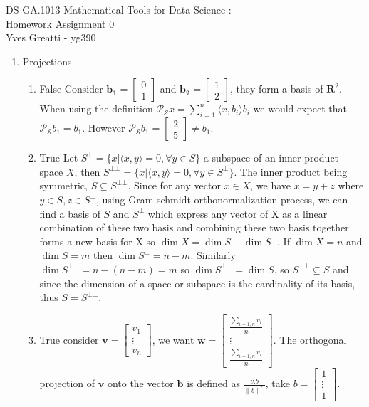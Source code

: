 \documentclass[10pt]{article}
\newcommand{\be}{\begin{enumerate}}
\newcommand{\ee}{\end{enumerate}}
\newcommand{\mat}[1]{{\mathbf #1}}
\newcommand{\0}{\mat{0}}
\newcommand{\vect}[1]{\bm{#1}} %
\newcommand{\Proj}{\mathcal{P}_{\mathcal{S}}}
\begin{document}
\noindent DS-GA.1013 Mathematical Tools for Data Science :\\
Homework Assignment 0 \\
Yves Greatti - yg390\\

\begin{enumerate}
\item Projections

\be
	\item False
	Consider 
	$\vect{b_1} = \begin{bmatrix} 0\\ 1\end{bmatrix}$ and $\vect{b_2} = \begin{bmatrix} 1\\ 2\end{bmatrix}$, they form a basis of $\mat{R}^2$.
	When using the definition $\Proj x = \sum_{i=1}^n \langle x, b_i \rangle b_i$ we would expect that $\Proj b_1 = b_1$. However $\Proj b_1 = \begin{bmatrix} 2\\ 5\end{bmatrix} \neq b_1$.
	\item True
	Let $S^\bot = \{x |  \langle x,y  \rangle  = 0, \forall y \in S \}$ a subspace of an inner product space $X$, then $S^{\bot\bot} = \{x |  \langle x,y  \rangle  = 0, \forall y \in S^\bot \}$. The inner product being symmetric, $S \subseteq S^{\bot\bot}$.
	Since for any vector $x \in X$, we have $x = y + z$ where $y \in S, z \in S^\bot$, using Gram-schmidt orthonormalization process, we can find a basis of $S$ and $S^\bot$ which express any vector of X as a linear combination
	of these two basis and combining these two basis together forms a new basis for X so $\dim X = \dim S + \dim S^\bot$. If $\dim X = n$ and $\dim S = m$ then $\dim S^\bot = n - m$.
	Similarly $\dim S^{\bot\bot} = n  - (n- m) = m$ so $\dim S^{\bot\bot} = \dim S$, so $S^{\bot\bot} \subseteq S$  and since the dimension of a space or subspace is the cardinality of its basis, thus $S = S^{\bot\bot}$.
	\item True consider $\vect{v} = \begin{bmatrix} v_1\\ \vdots\\ v_n\end{bmatrix}$, we want $\vect{w} = \begin{bmatrix} \frac{\sum_{i=1,n} v_i}{n}\\ \vdots\\ \frac{\sum_{i=1,n} v_i}{n}\end{bmatrix}$. The orthogonal projection
	of $\vect{v}$ onto the vector $\vect{b}$ is defined as $\frac{v . b} {\| b \|^2}$, take  $b= \begin{bmatrix} 1\\  \vdots\\1 \end{bmatrix}$.
\ee


\end{enumerate}
\end{document}
